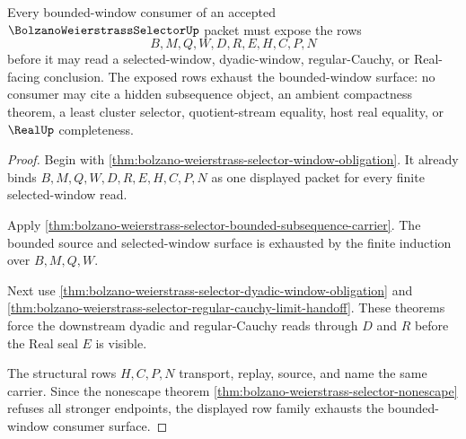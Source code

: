 \begin{theorem}
\label{thm:bolzano-weierstrass-selector-bounded-window-exhaustion}
Every bounded-window consumer of an accepted $\BolzanoWeierstrassSelectorUp$ packet must expose the rows
$$
B,M,Q,W,D,R,E,H,C,P,N
$$
before it may read a selected-window, dyadic-window, regular-Cauchy, or Real-facing conclusion. The exposed rows exhaust the bounded-window surface: no consumer may cite a hidden subsequence object, an ambient compactness theorem, a least cluster selector, quotient-stream equality, host real equality, or $\RealUp$ completeness.
\end{theorem}
\begin{proof}
Begin with \autoref{thm:bolzano-weierstrass-selector-window-obligation}. It already binds $B,M,Q,W,D,R,E,H,C,P,N$ as one displayed packet for every finite selected-window read.

Apply \autoref{thm:bolzano-weierstrass-selector-bounded-subsequence-carrier}. The bounded source and selected-window surface is exhausted by the finite induction over $B,M,Q,W$.

Next use \autoref{thm:bolzano-weierstrass-selector-dyadic-window-obligation} and \autoref{thm:bolzano-weierstrass-selector-regular-cauchy-limit-handoff}. These theorems force the downstream dyadic and regular-Cauchy reads through $D$ and $R$ before the Real seal $E$ is visible.

The structural rows $H,C,P,N$ transport, replay, source, and name the same carrier. Since the nonescape theorem \autoref{thm:bolzano-weierstrass-selector-nonescape} refuses all stronger endpoints, the displayed row family exhausts the bounded-window consumer surface.
\end{proof}



